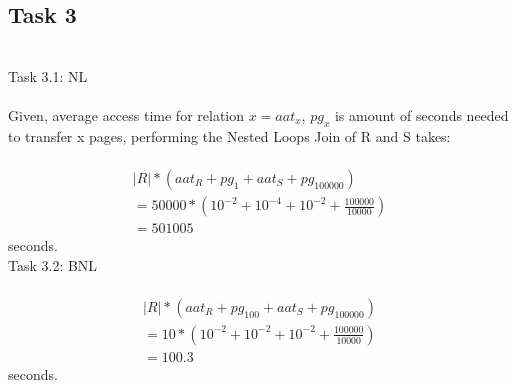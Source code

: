 \documentclass[10pt,a4paper]{article}
\begin{document}
\subsection{Task 3}
~\\
Task 3.1: NL\\
~\\
Given, average access time for relation $x = aat_x$, $pg_x$ is amount of seconds needed to transfer x pages, performing the Nested Loops Join of R and S takes:\\
~\\
\begin{gather*}
|R|*(aat_R + pg_1 + aat_S + pg_{100000}) \\
= 50 000 * (10^{-2} + 10^{-4} + 10^{-2} + \frac{100000}{10000})\\
= 501005
\end{gather*}
seconds.
~\\
Task 3.2: BNL\\
~\\
\begin{gather*}
|R|*(aat_R + pg_{100} + aat_S + pg_{100000}) \\
= 10 * (10^{-2} + 10^{-2} + 10^{-2} + \frac{100000}{10000})\\
= 100.3
\end{gather*}
seconds.
\end{document}
